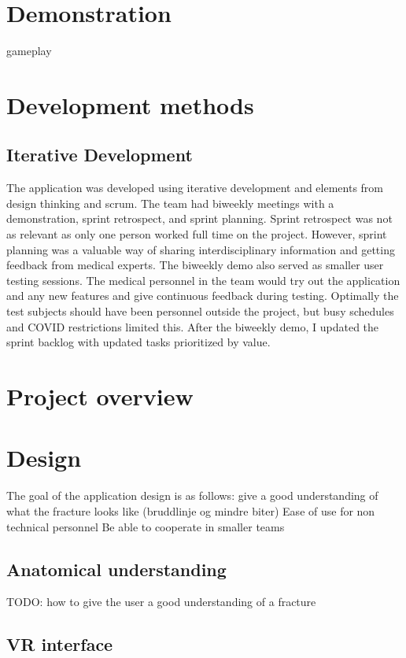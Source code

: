 \documentclass[a4paper]{report}
\begin{document}
\section{Demonstration}\label{demonstration}
gameplay

\section{Development methods}

\subsection{Iterative Development}
The application was developed using iterative development and elements from design thinking and scrum.
The team had biweekly meetings with a demonstration, sprint retrospect, and sprint planning. Sprint retrospect was not as relevant as only one person worked full time on the project. However, sprint planning was a valuable way of sharing interdisciplinary information and getting feedback from medical experts.
The biweekly demo also served as smaller user testing sessions. The medical personnel in the team would try out the application and any new features and give continuous feedback during testing. Optimally the test subjects should have been personnel outside the project, but busy schedules and COVID restrictions limited this.
After the biweekly demo, I updated the sprint backlog with updated tasks prioritized by value.

\section{Project overview}\label{CodeStructure}

\section{Design}

The goal of the application design is as follows:
give a good understanding of what the fracture looks like (bruddlinje og mindre biter)
Ease of use for non technical personnel
Be able to cooperate in smaller teams

\subsection{Anatomical understanding}
TODO: how to give the user a good understanding of a fracture

\subsection{VR interface}
\end{document}
